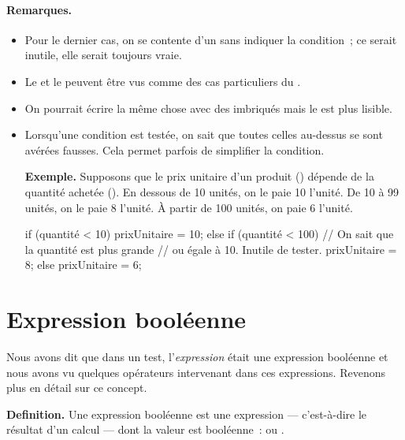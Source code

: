 	\paragraph{Remarques.}
	\begin{itemize}
	\item
		Pour le dernier cas, on se contente
		d’un  sans indiquer la condition~;
		ce serait inutile, elle serait toujours vraie.
	\item
		Le  et le  
		peuvent être vus comme des cas particuliers du 
		.
	\item
		On pourrait écrire la même chose 
		avec des  imbriqués
		mais le  est plus lisible.
	\item Lorsqu’une condition est testée, on sait que toutes celles au-dessus se
		sont avérées fausses.  Cela permet parfois de simplifier la condition.

		\textbf{Exemple.}
		Supposons que le prix unitaire d’un produit ()
		dépende de la quantité achetée (). 
		En dessous de 10 unités, on le paie 10\texteuro{} l’unité.
		De 10 à 99 unités, on le paie 8\texteuro{} l’unité.
		À partir de 100 unités, on paie 6\texteuro{} l’unité.

		\begin{java}
if (quantité < 10){
	prixUnitaire = 10;
} else if (quantité < 100) {
	// On sait que la quantité est plus grande
	// ou égale à 10. Inutile de tester. 
	prixUnitaire = 8;
} else {
	prixUnitaire = 6;
}
		\end{java}
		
	\end{itemize}


\section{Expression booléenne}
\label{expression booléenne}

Nous avons dit que dans un test, l'\textit{expression} était une expression
booléenne et nous avons vu quelques opérateurs intervenant dans ces
expressions.  Revenons plus en détail sur ce concept. 

\textbf{Definition.} Une expression booléenne est une expression — c'est-à-dire
le résultat d'un calcul — dont la valeur est booléenne~:  ou
. 

